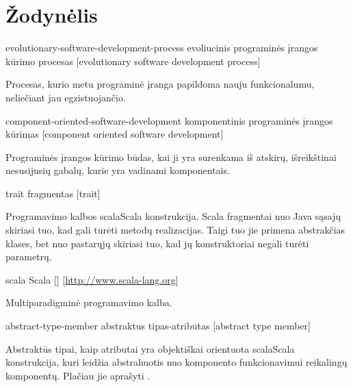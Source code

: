 \chapter{Žodynėlis}

\begin{glossary}

  \begin{entry}%
    {evolutionary-software-development-process}%
    {evoliucinis programinės įrangos kūrimo procesas}%
    [evolutionary software development process]

    Procesas, kurio metu programinė įranga papildoma nauju funkcionalumu,
    neliečiant jau egzistuojančio.
    
  \end{entry}

  \begin{entry}%
    {component-oriented-software-development}%
    {komponentinis programinės įrangos kūrimas}%
    [component oriented software development]

    Programinės įrangos kūrimo būdas, kai ji yra surenkama iš atskirų,
    išreikštinai nesusijusių gabalų, kurie yra vadinami komponentais.
    
  \end{entry}

  \begin{entry}%
    {trait}%
    {fragmentas}%
    [trait]

    Programavimo kalbos \gls{scala}{Scala} konstrukcija. Scala
    fragmentai nuo Java sąsajų skiriasi tuo, kad gali turėti metodų
    realizacijas. Taigi tuo jie primena abstrakčias klases, bet nuo
    pastarųjų skiriasi tuo, kad jų konstruktoriai negali turėti
    parametrų.
  
  \end{entry}

  \begin{entry}%
    {scala}%
    {Scala}%
    []%
    [\url{http://www.scala-lang.org}]

    Multiparadigminė programavimo kalba.
    
  \end{entry}

  \begin{entry}%
    {abstract-type-member}%
    {abstraktus tipas-atributas}%
    [abstract type member]

    Abstraktūs tipai, kaip atributai yra objektiškai orientuota
    \gls{scala}{Scala} konstrukcija, kuri leidžia abstrahuotis nuo
    komponento funkcionavimui reikalingų komponentų. Plačiau
    jie aprašyti \cite[8]{scala-overview}.
    

\end{entry}
\end{glossary}
